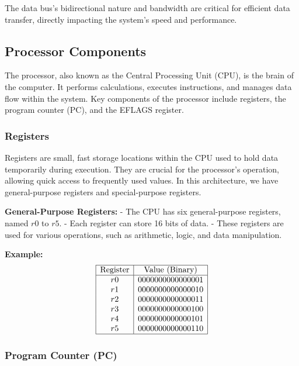 \documentclass{report}
\begin{document}
The data bus's bidirectional nature and bandwidth are critical for efficient data transfer, directly impacting the system's speed and performance.

\subsection{Processor Components}

The processor, also known as the Central Processing Unit (CPU), is the brain of the computer. It performs calculations, executes instructions, and manages data flow within the system. Key components of the processor include registers, the program counter (PC), and the EFLAGS register.

\subsubsection{Registers}

Registers are small, fast storage locations within the CPU used to hold data temporarily during execution. They are crucial for the processor's operation, allowing quick access to frequently used values. In this architecture, we have general-purpose registers and special-purpose registers.

\textbf{General-Purpose Registers:}
- The CPU has six general-purpose registers, named \(r0\) to \(r5\).
- Each register can store 16 bits of data.
- These registers are used for various operations, such as arithmetic, logic, and data manipulation.

\textbf{Example:}
\[
	\begin{array}{|c|c|}
		\hline
		\text{Register} & \text{Value (Binary)} \\
		\hline
		r0              & 0000000000000001      \\
		r1              & 0000000000000010      \\
		r2              & 0000000000000011      \\
		r3              & 0000000000000100      \\
		r4              & 0000000000000101      \\
		r5              & 0000000000000110      \\
		\hline
	\end{array}
\]

\subsubsection{Program Counter (PC)}
\end{document}

